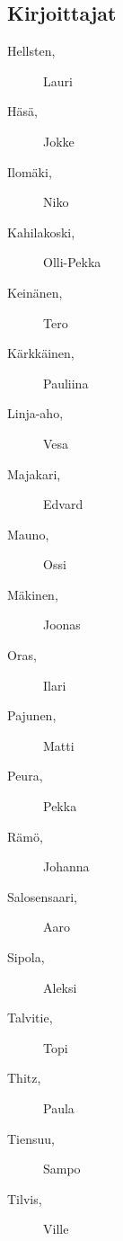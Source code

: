 \subsection*{Kirjoittajat}
\begin{description}
\item[Hellsten, ] Lauri
\item[Häsä, ] Jokke
\item[Ilomäki, ] Niko
\item[Kahilakoski, ] Olli-Pekka
\item[Keinänen, ] Tero
\item[Kärkkäinen, ] Pauliina
\item[Linja-aho, ] Vesa
\item[Majakari, ] Edvard
\item[Mauno, ] Ossi
\item[Mäkinen, ] Joonas
\item[Oras, ] Ilari
\item[Pajunen, ] Matti
\item[Peura, ] Pekka
\item[Rämö, ] Johanna
\item[Salosensaari, ] Aaro
\item[Sipola, ] Aleksi
\item[Talvitie, ] Topi
\item[Thitz, ] Paula
\item[Tiensuu, ] Sampo
\item[Tilvis, ] Ville
\end{description}


